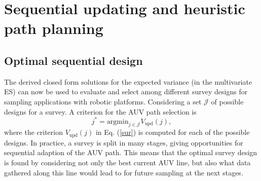 \documentclass[aoas]{imsart}
\begin{document}





\section{Sequential updating and heuristic path planning}\label{sec:heuristics}

\subsection{Optimal sequential design}
\label{myopic}

The derived closed form solutions for the expected variance (in the multivariate ES) can now be used to evaluate and select among different survey designs for sampling applications with robotic platforms. 
Considering a set $\mathcal{J}$ of possible designs for a survey. A criterion for the AUV path selection is
\begin{equation}\label{crit}
    j^* = \mbox{argmin}_{j \in \mathcal{J}} V_{\mbox{upd}}(j),
\end{equation}
where the criterion $V_{\mbox{upd}}(j)$ in Eq. (\ref{sur}) is computed for each of the possible designs.
In practice, a survey is split in many stages, giving opportunities for sequential adaption of the AUV path. This means that the optimal survey design is found by considering not only the best current AUV line, but also what data gathered along this line would lead to for future sampling at the next stages. 
\end{document}
